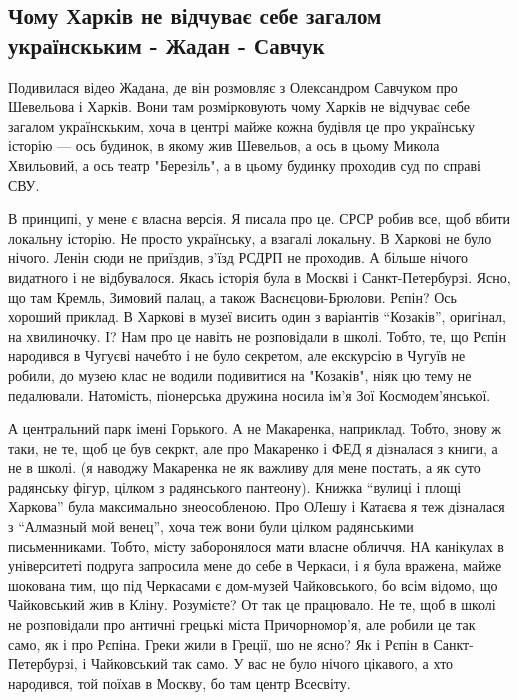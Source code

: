  
 
 
 
 
\subsection{Чому Харків не відчуває себе загалом українскьким - Жадан - Савчук}
\label{sec:15_04_2021.fb.promovugroup.1.harkov_zhadan_istoria_sssr}

Подивилася відео Жадана, де він розмовляє з Олександром Савчуком про Шевельова
і Харків. Вони там розмірковують чому Харків не відчуває себе загалом
українскьким, хоча в центрі майже кожна будівля це про українську історію — ось
будинок, в якому жив Шевельов, а ось в цьому Микола Хвильовий, а ось театр
"Березіль", а в цьому будинку проходив суд по справі СВУ.  

В принципі, у мене є
власна версія. Я писала про це. СРСР робив все, щоб вбити локальну історію. Не
просто українську, а взагалі локальну. В Харкові не було нічого. Ленін сюди не
приїздив, з'їзд РСДРП не проходив. А більше нічого видатного і не відбувалося.
Якась історія була в Москві і Санкт-Петербурзі. Ясно, що там Кремль, Зимовий
палац, а також Васнєцови-Брюлови. Рєпін? Ось хороший приклад. В Харкові в музеї
висить один з варіантів \enquote{Козаків}, оригінал, на хвилиночку. І? Нам про це
навіть не розповідали в школі. Тобто, те, що Рєпін народився в Чугуєві начебто
і не було секретом, але екскурсію в Чугуїв не робили, до музею клас не водили
подивитися на "Козаків", ніяк цю тему не педалювали. Натомість, піонерська
дружина носила ім'я Зої Космодем'янської. 

А центральний парк імені Горького. А
не Макаренка, наприклад. Тобто, знову ж таки, не те, щоб це був секркт, але про
Макаренко і ФЕД я дізналася з книги, а не в школі. (я наводжу Макаренка не як
важливу для мене постать, а як суто радянську фігур, цілком з радянського
пантеону). Книжка \enquote{вулиці і площі Харкова} була максимально знеособленою. Про
ОЛешу і Катаєва я теж дізналася з \enquote{Алмазный мой венец}, хоча теж вони були
цілком радянськими письменниками. Тобто, місту заборонялося мати власне
обличчя. НА канікулах в університеті подруга запросила мене до себе в Черкаси,
і я була вражена, майже шокована тим, що під Черкасами є дом-музей
Чайковського, бо всім відомо, що Чайковський жив в Кліну. Розумієте? От так це
працювало. Не те, щоб в школі не розповідали про античні грецькі міста
Причорномор'я, але робили це так само, як і про Рєпіна. Греки жили в Греції, шо
не ясно? Як і Рєпін в Санкт-Петербурзі, і Чайковський так само. У вас не було
нічого цікавого, а хто народився, той поїхав в Москву, бо там центр Всесвіту. 

